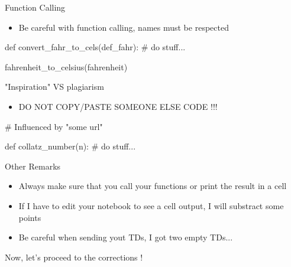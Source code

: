 \documentclass[serif, aspectratio=169]{beamer}
\begin{document}
\begin{frame}[fragile]{Function Calling}
    \begin{itemize}
        \item Be careful with function calling, names must be respected
    \end{itemize}
    \begin{pythoncode}
    def convert_fahr_to_cels(def_fahr):
        # do stuff...

    fahrenheit_to_celsius(fahrenheit)
    \end{pythoncode}
\end{frame}

\begin{frame}[fragile]{"Inspiration" VS plagiarism}
    \begin{itemize}
        \item DO NOT COPY/PASTE SOMEONE ELSE CODE !!!
    \end{itemize}
    \begin{pythoncode}
    # Influenced by "some url"

    def collatz_number(n):
        # do stuff...
    \end{pythoncode}
\end{frame}

\begin{frame}{Other Remarks}
    \begin{itemize}
        \item Always make sure that you call your functions or print the result in a cell 
        \item If I have to edit your notebook to see a cell output, I will substract some points
        \item Be careful when sending yout TDs, I got two empty TDs...
    \end{itemize}
\end{frame}



\begin{exoframe}
    \begin{center}
        \Large
        Now, let's proceed to the corrections !
    \end{center}
\end{exoframe}
\end{document}
